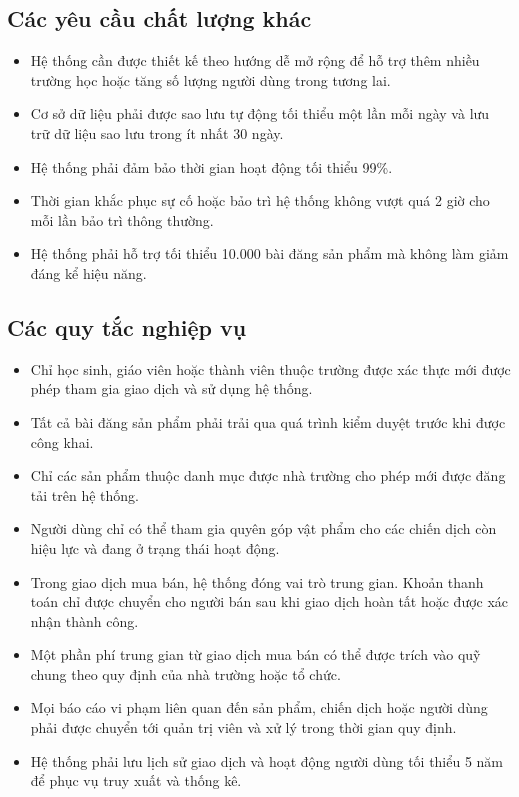 \documentclass[12pt,a4paper]{report}
\begin{document}
\subsection{Các yêu cầu chất lượng khác}

\begin{itemize}[label=--, leftmargin=1.2cm]
\item Hệ thống cần được thiết kế theo hướng dễ mở rộng để hỗ trợ thêm nhiều trường học hoặc tăng số lượng người dùng trong tương lai.
\item Cơ sở dữ liệu phải được sao lưu tự động tối thiểu một lần mỗi ngày và lưu trữ dữ liệu sao lưu trong ít nhất 30 ngày.

\item Hệ thống phải đảm bảo thời gian hoạt động tối thiểu 99\%.

\item Thời gian khắc phục sự cố hoặc bảo trì hệ thống không vượt quá 2 giờ cho mỗi lần bảo trì thông thường.

\item Hệ thống phải hỗ trợ tối thiểu 10.000 bài đăng sản phẩm mà không làm giảm đáng kể hiệu năng.

\end{itemize}

\subsection{Các quy tắc nghiệp vụ}

\begin{itemize}[label=--, leftmargin=1.2cm]
\item Chỉ học sinh, giáo viên hoặc thành viên thuộc trường được xác thực mới được phép tham gia giao dịch và sử dụng hệ thống.

\item Tất cả bài đăng sản phẩm phải trải qua quá trình kiểm duyệt trước khi được công khai.

\item Chỉ các sản phẩm thuộc danh mục được nhà trường cho phép mới được đăng tải trên hệ thống.

\item Người dùng chỉ có thể tham gia quyên góp vật phẩm cho các chiến dịch còn hiệu lực và đang ở trạng thái hoạt động.

\item Trong giao dịch mua bán, hệ thống đóng vai trò trung gian. Khoản thanh toán chỉ được chuyển cho người bán sau khi giao dịch hoàn tất hoặc được xác nhận thành công.

\item Một phần phí trung gian từ giao dịch mua bán có thể được trích vào quỹ chung theo quy định của nhà trường hoặc tổ chức.

\item Mọi báo cáo vi phạm liên quan đến sản phẩm, chiến dịch hoặc người dùng phải được chuyển tới quản trị viên và xử lý trong thời gian quy định.

\item Hệ thống phải lưu lịch sử giao dịch và hoạt động người dùng tối thiểu 5 năm để phục vụ truy xuất và thống kê.

\end{itemize}
\end{document}
